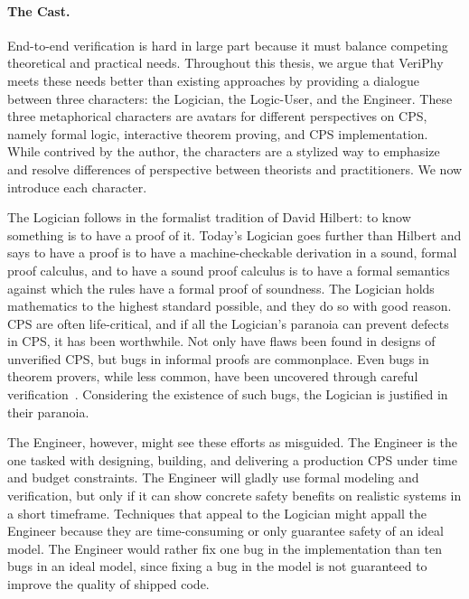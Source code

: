 \documentclass[12pt]{cmuthesis}
\theoremstyle{definition}
\theoremstyle{remark}
\newcommand{\VeriPhy}{VeriPhy\xspace}
\begin{document}
\paragraph{The Cast.}
End-to-end verification is hard in large part because it must balance competing theoretical and practical needs.
Throughout this thesis, we argue that \VeriPhy meets these needs better than existing approaches by providing a dialogue between three characters: the Logician, the Logic-User, and the Engineer.
These three metaphorical characters are avatars for different perspectives on CPS, namely formal logic, interactive theorem proving, and CPS implementation.
While contrived by the author, the characters are a stylized way to emphasize and resolve differences of perspective between theorists and practitioners.
We now introduce each character.

The Logician follows in the formalist tradition of David Hilbert: to know something is to have a proof of it.
Today's Logician goes further than Hilbert and says to have a proof is to have a machine-checkable derivation in a sound, formal proof calculus, and to have a sound proof calculus is to have a formal semantics against which the rules have a formal proof of soundness.
The Logician holds mathematics to the highest standard possible, and they do so with good reason.
CPS are often life-critical, and if all the Logician's paranoia can prevent defects in CPS, it has been worthwhile.
Not only have flaws been found in designs of unverified CPS, but bugs in informal proofs are commonplace.
Even bugs in theorem provers, while less common, have been uncovered through careful verification~\cite{DBLP:conf/cpp/BohrerRVVP17}.
Considering the existence of such bugs, the Logician is justified in their paranoia.

The Engineer, however, might see these efforts as misguided.
The Engineer is the one tasked with designing, building, and delivering a production CPS under time and budget constraints.
The Engineer will gladly use formal modeling and verification, but only if it can show concrete safety benefits on realistic systems in a short timeframe.
Techniques that appeal to the Logician might appall the Engineer because they are time-consuming or only guarantee safety of an ideal model.
The Engineer would rather fix one bug in the implementation than ten bugs in an ideal model, since fixing a bug in the model is not guaranteed to improve the quality of shipped code.
\end{document}
